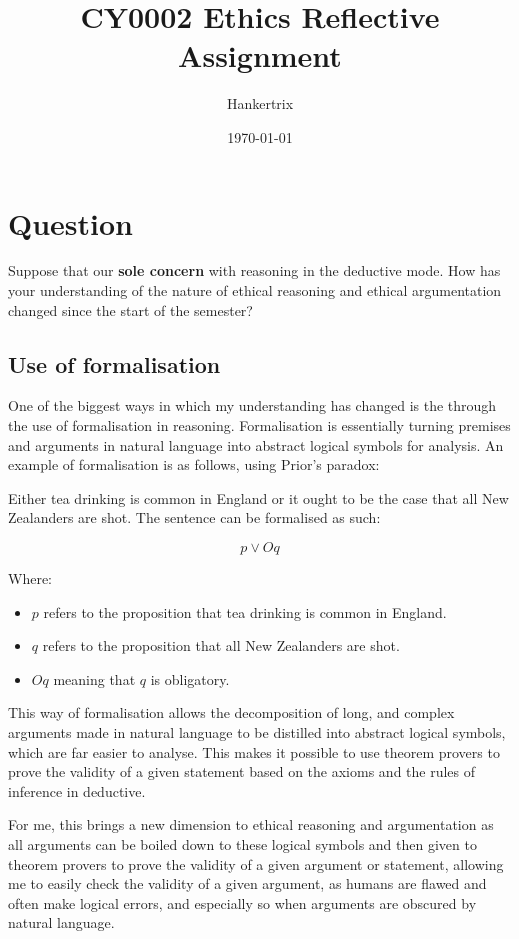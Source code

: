 \documentclass[11pt]{article}
\author{Hankertrix}
\date{\today}
\title{CY0002 Ethics Reflective Assignment}
\begin{document}
\maketitle
\setcounter{tocdepth}{2}
\tableofcontents \clearpage\section{Question}
\label{sec:org9f19923}
Suppose that our \textbf{sole concern} with reasoning in the deductive mode. How has your understanding of the nature of ethical reasoning and ethical argumentation changed since the start of the semester?
\subsection{Use of formalisation}
\label{sec:orgbf73367}
One of the biggest ways in which my understanding has changed is the through the use of formalisation in reasoning. Formalisation is essentially turning premises and arguments in natural language into abstract logical symbols for analysis. An example of formalisation is as follows, using Prior's paradox:

Either tea drinking is common in England or it ought to be the case that all New Zealanders are shot. The sentence can be formalised as such:

\[p \vee Oq\]

Where:
\begin{itemize}
\item \(p\) refers to the proposition that tea drinking is common in England.
\item \(q\) refers to the proposition that all New Zealanders are shot.
\item \(Oq\) meaning that \(q\) is obligatory.
\end{itemize}

This way of formalisation allows the decomposition of long, and complex arguments made in natural language to be distilled into abstract logical symbols, which are far easier to analyse. This makes it possible to use theorem provers to prove the validity of a given statement based on the axioms and the rules of inference in deductive.

For me, this brings a new dimension to ethical reasoning and argumentation as all arguments can be boiled down to these logical symbols and then given to theorem provers to prove the validity of a given argument or statement, allowing me to easily check the validity of a given argument, as humans are flawed and often make logical errors, and especially so when arguments are obscured by natural language.
\end{document}
